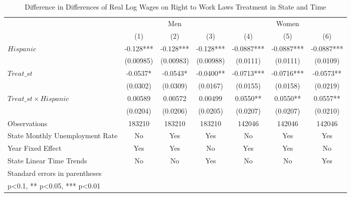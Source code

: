 \begin{table}[htbp]\centering
\def\sym#1{\ifmmode^{#1}\else\(^{#1}\)\fi}
\caption{Difference in Differences of Real Log Wages on Right to Work Laws Treatment in State and Time}
\begin{tabular}{l*{6}{c}}
\hline\hline
                    &\multicolumn{3}{c}{Men}                        &\multicolumn{3}{c}{Women}                      \\\cmidrule(lr){2-4}\cmidrule(lr){5-7}
                    &\multicolumn{1}{c}{(1)}   &\multicolumn{1}{c}{(2)}   &\multicolumn{1}{c}{(3)}   &\multicolumn{1}{c}{(4)}   &\multicolumn{1}{c}{(5)}   &\multicolumn{1}{c}{(6)}   \\
\hline
$ Hispanic $        &      -0.128***&      -0.128***&      -0.128***&     -0.0887***&     -0.0887***&     -0.0887***\\
                    &   (0.00985)   &   (0.00983)   &   (0.00988)   &    (0.0111)   &    (0.0111)   &    (0.0109)   \\
[1em]
$ Treat\_{st} $      &     -0.0537*  &     -0.0543*  &     -0.0400** &     -0.0713***&     -0.0716***&     -0.0573** \\
                    &    (0.0302)   &    (0.0309)   &    (0.0167)   &    (0.0155)   &    (0.0158)   &    (0.0219)   \\
[1em]
$ Treat\_{st} \times Hispanic $&     0.00589   &     0.00572   &     0.00499   &      0.0550** &      0.0550** &      0.0557** \\
                    &    (0.0204)   &    (0.0206)   &    (0.0205)   &    (0.0207)   &    (0.0207)   &    (0.0210)   \\
\hline
Observations        &      183210   &      183210   &      183210   &      142046   &      142046   &      142046   \\
State Monthly Unemployment Rate&          No   &         Yes   &         Yes   &          No   &         Yes   &         Yes   \\
Year Fixed Effect   &         Yes   &         Yes   &          No   &         Yes   &         Yes   &          No   \\
State Linear Time Trends&          No   &          No   &         Yes   &          No   &          No   &         Yes   \\
\hline\hline
\multicolumn{7}{l}{\footnotesize Standard errors in parentheses}\\
\multicolumn{7}{l}{\footnotesize * p<0.1, ** p<0.05, *** p<0.01}\\
\end{tabular}
\end{table}
